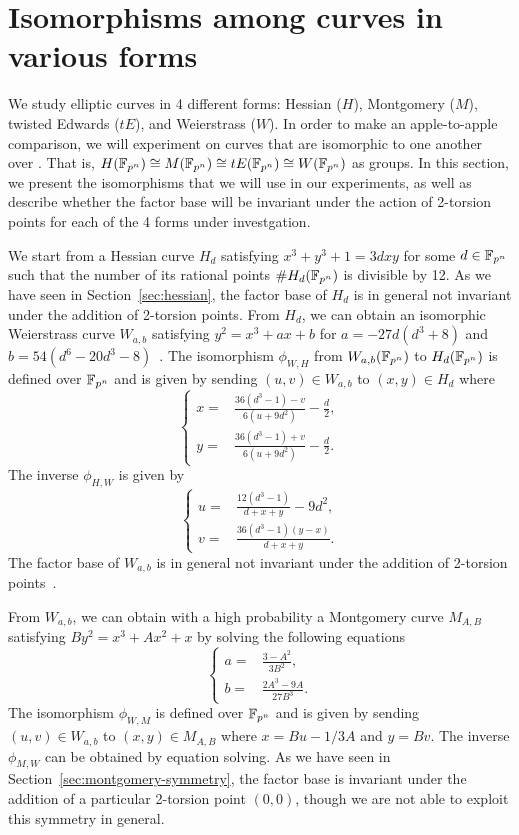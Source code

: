 %
%

\section{Isomorphisms among curves in various forms}
\label{sec:isomorphisms}

We study elliptic curves in 4 different forms: Hessian ($H$),
Montgomery ($M$), twisted Edwards ($tE$), and Weierstrass ($W$).
%
In order to make an apple-to-apple comparison, we will experiment on
curves that are isomorphic to one another over .
%
That is, $H(\mathbb F_{p^n})\cong M(\mathbb F_{p^n})\cong tE(\mathbb F_{p^n})\cong W(\mathbb F_{p^n})$
as groups.
%
In this section, we present the isomorphisms that we will use in our
experiments, as well as describe whether the factor base will be
invariant under the action of 2-torsion points for each of the 4 forms
under investgation.

We start from a Hessian curve $H_d$ satisfying $x^3 + y^3 + 1 = 3dxy$
for some $d\in\mathbb F_{p^n}$ such that the number of its rational points
$\#H_d(\mathbb F_{p^n})$ is divisible by 12.
%
As we have seen in Section~\ref{sec:hessian}, the factor base of $H_d$
is in general not invariant under the addition of 2-torsion points.
%
 From $H_d$, we can obtain an isomorphic Weierstrass curve $W_{a,b}$
satisfying $y^2 = x^3 + ax + b$ for $a = - 27d(d^3 + 8)$ and
$b = 54(d^6 - 20d^3 - 8)$~\cite{DBLP:conf/ches/Smart01}.
%
The isomorphism $\phi_{W,H}$ from $W_{a,b}(\mathbb F_{p^n})$ to $H_d(\mathbb F_{p^n})$
is defined over $\mathbb F_{p^n}$ and is given by sending $(u,v)\in W_{a,b}$
to $(x,y)\in H_d$ where
\[ \left\{\begin{aligned}
x = & \frac{36(d^3 - 1) - v}{6(u + 9d^2)} - \frac{d}{2}, \\
y = & \frac{36(d^3 - 1) + v}{6(u + 9d^2)} - \frac{d}{2}.
\end{aligned}\right. \]
%
The inverse $\phi_{H,W}$ is given by
\[ \left\{\begin{aligned}
u = & \frac{12(d^3 - 1)}{d + x + y} - 9d^2, \\
v = & \frac{36(d^3 - 1)(y - x)}{d + x + y}.
\end{aligned}\right. \]
%
The factor base of $W_{a,b}$ is in general not invariant under the
addition of 2-torsion points~\cite{DBLP:conf/eurocrypt/FaugereHJRV14}.

From $W_{a,b}$, we can obtain with a high probability a Montgomery
curve $M_{A,B}$ satisfying $By^2 = x^3 + Ax^2 + x$ by solving the
following equations
%
\[ \left\{\begin{aligned}
a = & \frac{3 - A^2}{3B^2}, \\
b = & \frac{2A^3 - 9A}{27B^3}.
\end{aligned}\right. \]
%
The isomorphism $\phi_{W,M}$ is defined over
$\mathbb F_{p^n}$ and is given by sending $(u,v)\in W_{a,b}$ to
$(x,y)\in M_{A,B}$ where $x = Bu - 1/3A$ and $y = Bv$.
%
The inverse $\phi_{M,W}$ can be obtained by equation solving.
%
As we have seen in Section~\ref{sec:montgomery-symmetry}, the factor
base is invariant under the addition of a particular 2-torsion point
$(0,0)$, though we are not able to exploit this symmetry in general.

